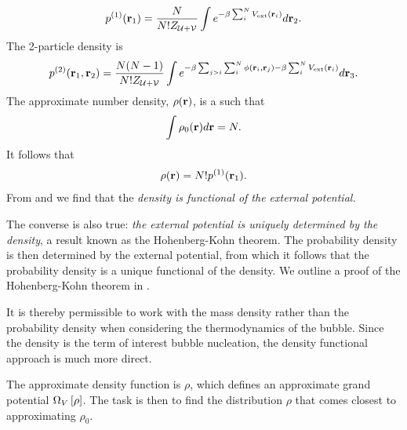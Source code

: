 {{  \begin{align}
    p^{(1)}(\textbf{r}_1) = \frac{N}{N! Z_{{\cal{U}}+{\cal{V}}}} \int e^{-\beta\sum_i^N V_{\text{ext}}(\textbf{r}_i)} d{\mathbf{\textbf{r}}}_2. \label{eqn:ponespatial}
  \end{align}
  The 2-particle density is 
  \begin{align}
    p^{(2)}(\textbf{r}_1, \textbf{r}_2) = \frac{N(N-1)}{N!Z_{{\cal{U}}+{\cal{V}}}}\int e^{-\beta\sum_{j>i} \sum_i^N \phi(\textbf{r}_i, \textbf{r}_j)-\beta\sum_i^N V_{\text{ext}}(\textbf{r}_i)} d{\mathbf{\textbf{r}}}_3.
  \end{align}
  The approximate number density, $\rho(\textbf{r})$, is a such that
  \begin{align}
    \int \rho_0(\textbf{r}) d\textbf{r} = N .
  \end{align}
  It follows that
  \begin{align}
    \rho(\textbf{r}) = N!  p^{(1)}(\textbf{r}_1). \label{eqn:rhoone}
  \end{align}
  From  and  we find that the {\em density is functional of the external potential.}
}

 The converse is also true:
 {\em the external potential is uniquely determined by the density},
 a result known as the Hohenberg-Kohn theorem.
 The probability density is then determined by the external potential,
 from which it follows that the probability density is a unique functional of the density.
 We outline a proof of the Hohenberg-Kohn theorem in .
 

It is thereby permissible to work with the mass density rather than the probability density when considering the thermodynamics of the bubble.
Since the density is the term of interest bubble nucleation, the density functional approach is much more direct.



%
The approximate density function is $\rho$, which defines an approximate grand potential $\Omega_V\left[ \rho \right]$.
The task is then to find the distribution $\rho$ that comes closest to approximating $\rho_0$.

}

